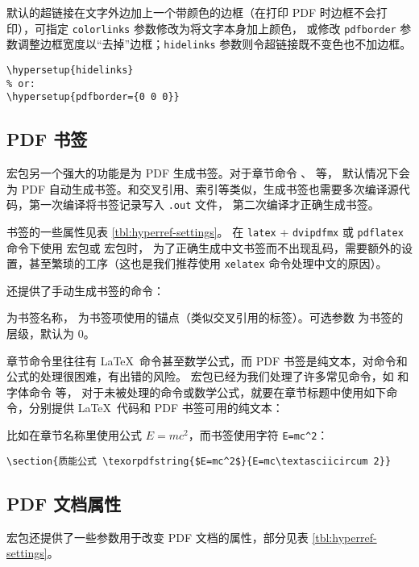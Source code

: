 默认的超链接在文字外边加上一个带颜色的边框（在打印 PDF 时边框不会打印），可指定 \texttt{color\-links} 参数修改为将文字本身加上颜色，
或修改 \texttt{pdf\-border} 参数调整边框宽度以“去掉”边框；\texttt{hide\-links} 参数则令超链接既不变色也不加边框。
\begin{verbatim}
\hypersetup{hidelinks}
% or:
\hypersetup{pdfborder={0 0 0}}
\end{verbatim}

\subsection{PDF 书签}\label{subsec:pdf-bookmark}

 宏包另一个强大的功能是为 PDF 生成书签。对于章节命令 、 等，
默认情况下会为 PDF 自动生成书签。和交叉引用、索引等类似，生成书签也需要多次编译源代码，第一次编译将书签记录写入 \texttt{.out} 文件，
第二次编译才正确生成书签。

书签的一些属性见表 \ref{tbl:hyperref-settings}。
在 \texttt{latex} + \texttt{dvipdfmx} 或 \texttt{pdflatex} 命令下使用  宏包或  宏包时，
为了正确生成中文书签而不出现乱码，需要额外的设置，甚至繁琐的工序（这也是我们推荐使用 \texttt{xelatex} 命令处理中文的原因）。

 还提供了手动生成书签的命令：
\begin{command}
\end{command}
 为书签名称， 为书签项使用的锚点（类似交叉引用的标签）。可选参数  为书签的层级，默认为 0。

章节命令里往往有 \LaTeX\ 命令甚至数学公式，而 PDF 书签是纯文本，对命令和公式的处理很困难，有出错的风险。
 宏包已经为我们处理了许多常见命令，如  和字体命令  等，
对于未被处理的命令或数学公式，就要在章节标题中使用如下命令，分别提供 \LaTeX\ 代码和 PDF 书签可用的纯文本：
\begin{command}
\end{command}
比如在章节名称里使用公式 $E=mc^2$，而书签使用字符 \texttt{E=mc\textasciicircum 2}：
\begin{verbatim}
\section{质能公式 \texorpdfstring{$E=mc^2$}{E=mc\textasciicircum 2}}
\end{verbatim}

\subsection{PDF 文档属性}\label{subsec:pdf-settings}

 宏包还提供了一些参数用于改变 PDF 文档的属性，部分见表 \ref{tbl:hyperref-settings}。


\endinput
